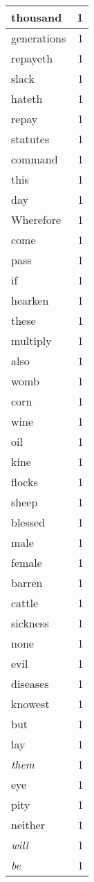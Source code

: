 \begin{center}
\begin{longtable}{l|r}
thousand & 1 \\ \hline
generations & 1 \\ \hline
repayeth & 1 \\ \hline
slack & 1 \\ \hline
hateth & 1 \\ \hline
repay & 1 \\ \hline
statutes & 1 \\ \hline
command & 1 \\ \hline
this & 1 \\ \hline
day & 1 \\ \hline
Wherefore & 1 \\ \hline
come & 1 \\ \hline
pass & 1 \\ \hline
if & 1 \\ \hline
hearken & 1 \\ \hline
these & 1 \\ \hline
multiply & 1 \\ \hline
also & 1 \\ \hline
womb & 1 \\ \hline
corn & 1 \\ \hline
wine & 1 \\ \hline
oil & 1 \\ \hline
kine & 1 \\ \hline
flocks & 1 \\ \hline
sheep & 1 \\ \hline
blessed & 1 \\ \hline
male & 1 \\ \hline
female & 1 \\ \hline
barren & 1 \\ \hline
cattle & 1 \\ \hline
sickness & 1 \\ \hline
none & 1 \\ \hline
evil & 1 \\ \hline
diseases & 1 \\ \hline
knowest & 1 \\ \hline
but & 1 \\ \hline
lay & 1 \\ \hline
\emph{them} & 1 \\ \hline
eye & 1 \\ \hline
pity & 1 \\ \hline
neither & 1 \\ \hline
\emph{will} & 1 \\ \hline
\emph{be} & 1 \\ \hline

\end{longtable}
\end{center}
